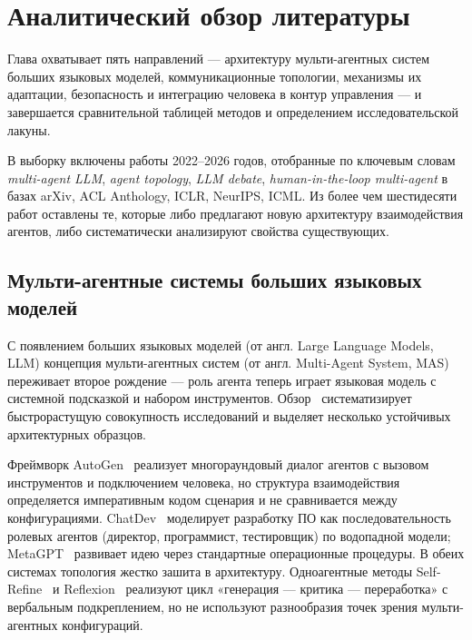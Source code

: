 
\section{Аналитический обзор литературы}
\label{sec:review}

Глава охватывает пять направлений --- архитектуру мульти-агентных
систем больших языковых моделей, коммуникационные топологии,
механизмы их адаптации, безопасность и интеграцию человека в
контур управления --- и завершается сравнительной таблицей методов
и определением исследовательской лакуны.

В выборку включены работы 2022--2026 годов, отобранные по ключевым
словам \emph{multi-agent LLM}, \emph{agent topology},
\emph{LLM debate}, \emph{human-in-the-loop multi-agent} в базах
arXiv, ACL Anthology, ICLR, NeurIPS, ICML. Из более чем шестидесяти
работ оставлены те, которые либо предлагают новую архитектуру
взаимодействия агентов, либо систематически анализируют свойства
существующих.

\subsection{Мульти-агентные системы больших языковых моделей}
\label{sec:rev:mas}

С появлением больших языковых моделей (от англ. Large Language
Models, LLM) концепция мульти-агентных систем
(от англ. Multi-Agent System, MAS) переживает второе рождение ---
роль агента теперь играет языковая модель с системной подсказкой
и набором инструментов. Обзор~\cite{wang2024} систематизирует
быстрорастущую совокупность исследований и выделяет несколько
устойчивых архитектурных образцов.

Фреймворк AutoGen~\cite{wu2023} реализует многораундовый диалог
агентов с вызовом инструментов и подключением человека, но
структура взаимодействия определяется императивным кодом сценария
и не сравнивается между конфигурациями. ChatDev~\cite{qian2024}
моделирует разработку ПО как последовательность ролевых агентов
(директор, программист, тестировщик) по водопадной модели;
MetaGPT~\cite{hong2024} развивает идею через стандартные
операционные процедуры. В обеих системах топология жестко зашита
в архитектуру. Одноагентные методы Self-Refine~\cite{selfrefine2024}
и Reflexion~\cite{reflexion2023} реализуют цикл «генерация ---
критика --- переработка» с вербальным подкреплением, но не
используют разнообразия точек зрения мульти-агентных конфигураций.

